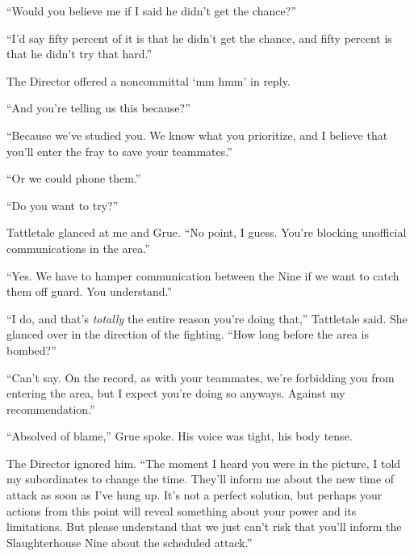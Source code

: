 ``Would you believe me if I said he didn't get the chance?''



``I'd say fifty percent of it is that he didn't get the chance, and fifty percent is that he didn't try that hard.''



The Director offered a noncommittal `mm hmm' in reply.



``And you're telling us this because?''



``Because we've studied you.  We know what you prioritize, and I believe that you'll enter the fray to save your teammates.''



``Or we could phone them.''



``Do you want to try?''



Tattletale glanced at me and Grue.  ``No point, I guess.  You're blocking unofficial communications in the area.''



``Yes.  We have to hamper communication between the Nine if we want to catch them off guard.  You understand.''



``I do, and that's \emph{totally} the entire reason you're doing that,'' Tattletale said.  She glanced over in the direction of the fighting.  ``How long before the area is bombed?''



``Can't say.  On the record, as with your teammates, we're forbidding you from entering the area, but I expect you're doing so anyways.  Against my recommendation.''



``Absolved of blame,'' Grue spoke.  His voice was tight, his body tense.



The Director ignored him.  ``The moment I heard you were in the picture, I told my subordinates to change the time.  They'll inform me about the new time of attack as soon as I've hung up.  It's not a perfect solution, but perhaps your actions from this point will reveal something about your power and its limitations.  But please understand that we just can't risk that you'll inform the Slaughterhouse Nine about the scheduled attack.''



